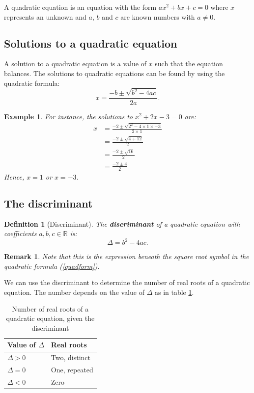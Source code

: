 \documentclass[12pt,a4paper]{article}
\renewcommand{\emph}{\textbf}
\theoremstyle{clearprint}
\newtheorem*{example*}{Example}
\newtheorem*{definition*}{Definition}
\newtheorem*{remark*}{Remark}
\begin{document}
A quadratic equation is an equation with the form \(ax^2 + bx + c = 0\) where \(x\) represents an unknown and \(a\), \(b\) and \(c\) are known numbers with \(a \neq 0\). 

\subsection{Solutions to a quadratic equation}

A solution to a quadratic equation is a value of \(x\) such that the equation balances. The solutions to quadratic equations can be found by using the quadratic formula: 
\begin{equation}
\label{quadform}
x = \frac{-b \pm \sqrt{b^2-4ac}}{2a}.
\end{equation}

\begin{example*}
For instance, the solutions to \(x^2 + 2x -3 = 0\) are:
\begin{align*}
x &= \frac{-2 \pm \sqrt{2^2-4\times 1 \times -3}}{2 \times 1}\\
\,&= \frac{-2 \pm \sqrt{4+12}}{2}\\
\,&= \frac{-2 \pm \sqrt{16}}{2}\\
\,&= \frac{-2 \pm 4}{2}
\end{align*} 
Hence, \(x = 1\) or \(x = -3\).  
\end{example*}

\subsection{The discriminant}

\begin{definition*}[Discriminant]
The \emph{discriminant} of a quadratic equation with coefficients \(a, b, c \in \mathbb{R}\) is:
\[
\Delta = b^2 - 4ac.
\]
\end{definition*}

\begin{remark*}
Note that this is the expression beneath the square root symbol in the quadratic formula (\ref{quadform}).
\end{remark*}

We can use the discriminant to determine the number of real roots of a quadratic equation. The number depends on the value of \(\Delta\) as in table \ref{Distable}.
\begin{table}[!h]
\begin{center}
\begin{tabular}{|l|l|}
\hline
Value of \(\Delta\) & Real roots \\
\hline
\(\Delta > 0\) & Two, distinct\\
\(\Delta = 0\) & One, repeated\\
\(\Delta < 0\) & Zero\\
\hline
\end{tabular}
\end{center}
\caption{Number of real roots of a quadratic equation, given the discriminant}
\label{Distable}
\end{table}
\end{document}
